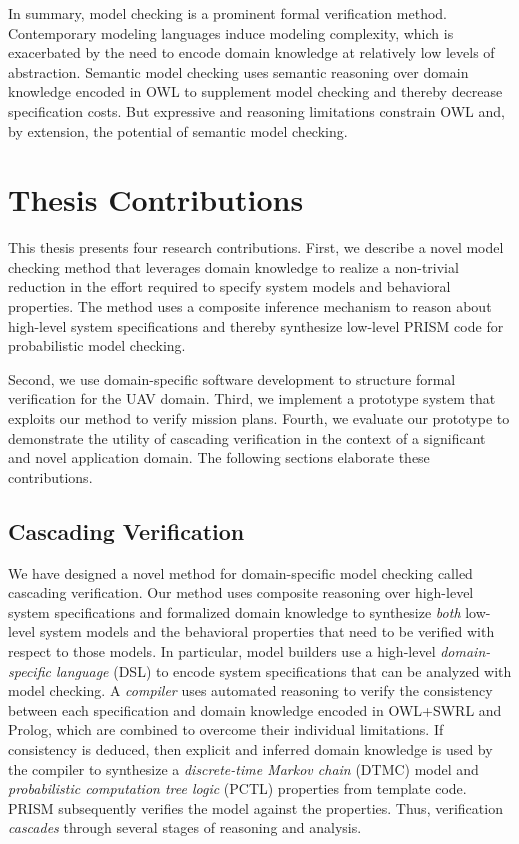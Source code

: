 In summary, model checking is a prominent formal verification method. Contemporary modeling languages induce modeling complexity, which is exacerbated by the need to encode domain knowledge at relatively low levels of abstraction. Semantic model checking uses semantic reasoning over domain knowledge encoded in OWL to supplement model checking and thereby decrease specification costs. But expressive and reasoning limitations constrain OWL and, by extension, the potential of semantic model checking.

\section{Thesis Contributions}

This thesis presents four research contributions. First, we describe a novel model checking method that leverages domain knowledge to realize a non-trivial reduction in the effort required to specify system models and behavioral properties. The method uses a composite inference mechanism to reason about high-level system specifications and thereby synthesize low-level PRISM code for probabilistic model checking.

Second, we use domain-specific software development to structure formal verification for the UAV domain. Third, we implement a prototype system that exploits our method to verify mission plans. Fourth, we evaluate our prototype to demonstrate the utility of cascading verification in the context of a significant and novel application domain. The following sections elaborate these contributions.

\subsection{Cascading Verification}

We have designed a novel method for domain-specific model checking called cascading verification. Our method uses composite reasoning over high-level system specifications and formalized domain knowledge to synthesize \emph{both} low-level system models and the behavioral properties that need to be verified with respect to those models. In particular, model builders use a high-level \emph{domain-specific language} (DSL) to encode system specifications that can be analyzed with model checking. A \emph{compiler} uses automated reasoning to verify the consistency between each specification and domain knowledge encoded in OWL+SWRL and Prolog, which are combined to overcome their individual limitations. If consistency is deduced, then explicit and inferred domain knowledge is used by the compiler to synthesize a \emph{discrete-time Markov chain} (DTMC) model and \emph{probabilistic computation tree logic} (PCTL) properties from template code. PRISM subsequently verifies the model against the properties. Thus, verification \emph{cascades} through several stages of reasoning and analysis.

